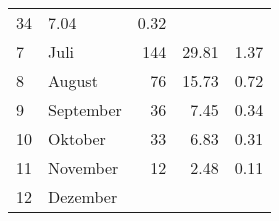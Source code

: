 \begin{longtable}{lXrrr}
       \num{34} &
       \num[round-mode=places,round-precision=2]{7,04} &
         \num[round-mode=places,round-precision=2]{0,32} \\

     7 &
     \multicolumn{1}{X}{ Juli   } &


       \num{144} &
       \num[round-mode=places,round-precision=2]{29,81} &
         \num[round-mode=places,round-precision=2]{1,37} \\

     8 &
     \multicolumn{1}{X}{ August   } &


       \num{76} &
       \num[round-mode=places,round-precision=2]{15,73} &
         \num[round-mode=places,round-precision=2]{0,72} \\

     9 &
     \multicolumn{1}{X}{ September   } &


       \num{36} &
       \num[round-mode=places,round-precision=2]{7,45} &
         \num[round-mode=places,round-precision=2]{0,34} \\

     10 &
     \multicolumn{1}{X}{ Oktober   } &


       \num{33} &
       \num[round-mode=places,round-precision=2]{6,83} &
         \num[round-mode=places,round-precision=2]{0,31} \\

     11 &
     \multicolumn{1}{X}{ November   } &


       \num{12} &
       \num[round-mode=places,round-precision=2]{2,48} &
         \num[round-mode=places,round-precision=2]{0,11} \\

     12 &
     \multicolumn{1}{X}{ Dezember   } &



\end{longtable}

